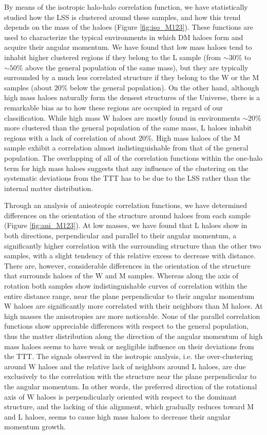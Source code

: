 \documentclass[fleqn,usenatbib]{mnras}
\newcommand{\Wh}{\mathrm{W}}
\newcommand{\Lh}{\mathrm{L}}
\newcommand{\Mh}{\mathrm{M}}
\begin{document}
By means of the isotropic halo-halo correlation function, we have statistically studied how the LSS is clustered around these samples, and how this trend depends on the mass of the haloes (Figure \ref{fig:iso_M123}). These functions are used to characterize the typical environments in which DM haloes form and acquire their angular momentum. We have found that low mass haloes tend to inhabit higher clustered regions if they belong to the $\Lh$ sample (from $\sim 30\%$ to $\sim 50\%$ above the general population of the same mass), but they are typically surrounded by a much less correlated structure if they belong to the $\Wh$ or the $\Mh$ samples (about $20\%$ below the general population). On the other hand, although high mass haloes naturally form the densest structures of the Universe, there is a remarkable bias as to how these regions are occupied in regard of our classification. While high mass $\Wh$ haloes are mostly found in environments $\sim 20\%$ more clustered than the general population of the same mass, $\Lh$ haloes inhabit regions with a lack of correlation of about $20\%$. High mass haloes of the $\Mh$ sample exhibit a correlation almost indistinguishable from that of the general population. The overlapping of all of the correlation functions within the one-halo term for high mass haloes suggests that any influence of the clustering on the systematic deviations from the TTT has to be due to the LSS rather than the internal matter distribution.

Through an analysis of anisotropic correlation functions, we have determined differences on the orientation of the structure around haloes from each sample (Figure \ref{fig:ani_M123}). 
At low masses, we have found that $\Lh$ haloes show in both directions, perpendicular and parallel to their angular momentum, a significantly higher correlation with the surrounding structure than the other two samples, with a slight tendency of this relative excess to decrease with distance. There are, however, considerable differences in the orientation of the structure that surrounds haloes of the $\Wh$ and $\Mh$ samples. Whereas along the axis of rotation both samples show indistinguishable curves of correlation within the entire distance range, near the plane perpendicular to their angular momentum $\Wh$ haloes are significantly more correlated with their neighbors than $\Mh$ haloes.
At high masses the anisotropies are more noticeable. None of the parallel correlation functions show appreciable differences with respect to the general population, thus the matter distribution along the direction of the angular momentum of high mass haloes seems to have weak or negligible influence on their deviations from the TTT. The signals observed in the isotropic analysis, i.e. the over-clustering around $\Wh$ haloes and the relative lack of neighbors around $\Lh$ haloes, are due exclusively to the correlation with the structure near the plane perpendicular to the angular momentum. In other words, the preferred direction of the rotational axis of $\Wh$ haloes is perpendicularly oriented with respect to the dominant structure, and the lacking of this alignment, which gradually reduces toward $\Mh$ and $\Lh$ haloes, seems to cause high mass haloes to decrease their angular momentum growth.
\end{document}
